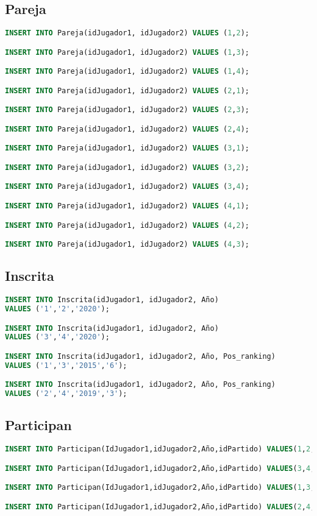 \subsection{Pareja}
\begin{lstlisting}[language=sql]
INSERT INTO Pareja(idJugador1, idJugador2) VALUES (1,2);

INSERT INTO Pareja(idJugador1, idJugador2) VALUES (1,3);

INSERT INTO Pareja(idJugador1, idJugador2) VALUES (1,4);

INSERT INTO Pareja(idJugador1, idJugador2) VALUES (2,1);

INSERT INTO Pareja(idJugador1, idJugador2) VALUES (2,3);

INSERT INTO Pareja(idJugador1, idJugador2) VALUES (2,4);

INSERT INTO Pareja(idJugador1, idJugador2) VALUES (3,1);

INSERT INTO Pareja(idJugador1, idJugador2) VALUES (3,2);

INSERT INTO Pareja(idJugador1, idJugador2) VALUES (3,4);

INSERT INTO Pareja(idJugador1, idJugador2) VALUES (4,1);

INSERT INTO Pareja(idJugador1, idJugador2) VALUES (4,2);

INSERT INTO Pareja(idJugador1, idJugador2) VALUES (4,3);
\end{lstlisting}

\subsection{Inscrita}
\begin{lstlisting}[language=sql]
INSERT INTO Inscrita(idJugador1, idJugador2, Año)
VALUES ('1','2','2020');

INSERT INTO Inscrita(idJugador1, idJugador2, Año)
VALUES ('3','4','2020');

INSERT INTO Inscrita(idJugador1, idJugador2, Año, Pos_ranking)
VALUES ('1','3','2015','6');

INSERT INTO Inscrita(idJugador1, idJugador2, Año, Pos_ranking)
VALUES ('2','4','2019','3');
\end{lstlisting}

\subsection{Participan}
\begin{lstlisting}[language=sql]
INSERT INTO Participan(IdJugador1,idJugador2,Año,idPartido) VALUES(1,2,2020,2);

INSERT INTO Participan(IdJugador1,idJugador2,Año,idPartido) VALUES(3,4,2020,1);

INSERT INTO Participan(IdJugador1,idJugador2,Año,idPartido) VALUES(1,3,2015,3);

INSERT INTO Participan(IdJugador1,idJugador2,Año,idPartido) VALUES(2,4,2019,4);
\end{lstlisting}

